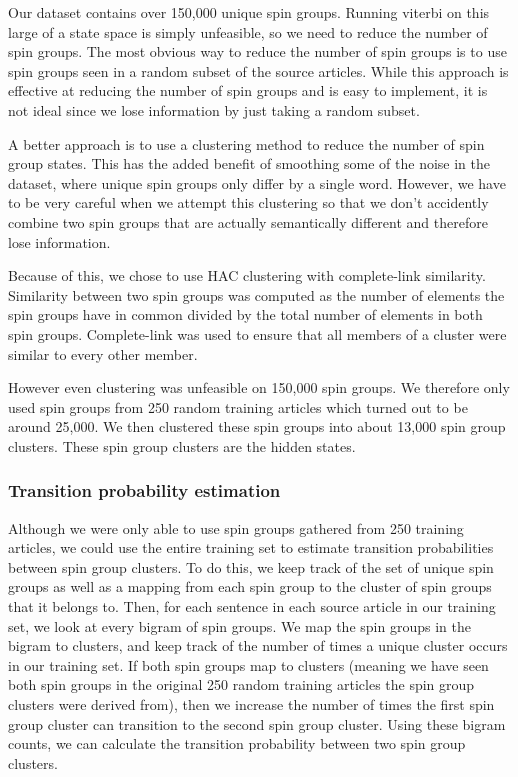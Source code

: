 \documentclass[11pt,letterpaper,oneside, titlepage]{scrartcl}
\begin{document}
Our dataset contains over 150,000 unique spin groups. Running viterbi on this large of a state space is simply unfeasible, so we need to reduce the number of spin groups. The most obvious way to reduce the number of spin groups is to use spin groups seen in a random subset of the source articles. While this approach is effective at reducing the number of spin groups and is easy to implement, it is not ideal since we lose information by just taking a random subset.

A better approach is to use a clustering method to reduce the number of spin group states. This has the added benefit of smoothing some of the noise in the dataset, where unique spin groups only differ by a single word. However, we have to be very careful when we attempt this clustering so that we don’t accidently combine two spin groups that are actually semantically different and therefore lose information.

Because of this, we chose to use HAC clustering with complete-link similarity. Similarity between two spin groups was computed as the number of elements the spin groups have in common divided by the total number of elements in both spin groups. Complete-link was used to ensure that all members of a cluster were similar to every other member.

However even clustering was unfeasible on 150,000 spin groups. We therefore only used spin groups from 250 random training articles which turned out to be around 25,000. We then clustered these spin groups into about 13,000 spin group clusters. These spin group clusters are the hidden states.

\subsubsection{Transition probability estimation}

Although we were only able to use spin groups gathered from 250 training articles, we could use the entire training set to estimate transition probabilities between spin group clusters. To do this, we keep track of the set of unique spin groups as well as a mapping from each spin group to the cluster of spin groups that it belongs to. Then, for each sentence in each source article in our training set, we look at every bigram of spin groups. We map the spin groups in the bigram to clusters, and keep track of the number of times a unique cluster occurs in our training set. If both spin groups map to clusters (meaning we have seen both spin groups in the original 250 random training articles the spin group clusters were derived from), then we increase the number of times the first spin group cluster can transition to the second spin group cluster. Using these bigram counts, we can calculate the transition probability between two spin group clusters.
\end{document}
